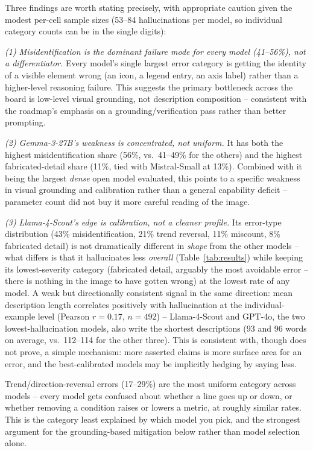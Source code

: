 \documentclass[10pt,conference]{IEEEtran}
\begin{document}
Three findings are worth stating precisely, with appropriate caution given the modest per-cell sample sizes (53--84 hallucinations per model, so individual category counts can be in the single digits):

\emph{(1) Misidentification is the dominant failure mode for every model (41--56\%), not a differentiator.} Every model's single largest error category is getting the identity of a visible element wrong (an icon, a legend entry, an axis label) rather than a higher-level reasoning failure. This suggests the primary bottleneck across the board is low-level visual grounding, not description composition -- consistent with the roadmap's emphasis on a grounding/verification pass rather than better prompting.

\emph{(2) Gemma-3-27B's weakness is concentrated, not uniform.} It has both the highest misidentification share (56\%, vs.\ 41--49\% for the others) and the highest fabricated-detail share (11\%, tied with Mistral-Small at 13\%). Combined with it being the largest \emph{dense} open model evaluated, this points to a specific weakness in visual grounding and calibration rather than a general capability deficit -- parameter count did not buy it more careful reading of the image.

\emph{(3) Llama-4-Scout's edge is calibration, not a cleaner profile.} Its error-type distribution (43\% misidentification, 21\% trend reversal, 11\% miscount, 8\% fabricated detail) is not dramatically different in \emph{shape} from the other models -- what differs is that it hallucinates less \emph{overall} (Table~\ref{tab:results}) while keeping its lowest-severity category (fabricated detail, arguably the most avoidable error -- there is nothing in the image to have gotten wrong) at the lowest rate of any model. A weak but directionally consistent signal in the same direction: mean description length correlates positively with hallucination at the individual-example level (Pearson $r=0.17$, $n=492$) -- Llama-4-Scout and GPT-4o, the two lowest-hallucination models, also write the shortest descriptions (93 and 96 words on average, vs.\ 112--114 for the other three). This is consistent with, though does not prove, a simple mechanism: more asserted claims is more surface area for an error, and the best-calibrated models may be implicitly hedging by saying less.

Trend/direction-reversal errors (17--29\%) are the most uniform category across models -- every model gets confused about whether a line goes up or down, or whether removing a condition raises or lowers a metric, at roughly similar rates. This is the category least explained by which model you pick, and the strongest argument for the grounding-based mitigation below rather than model selection alone.
\end{document}
